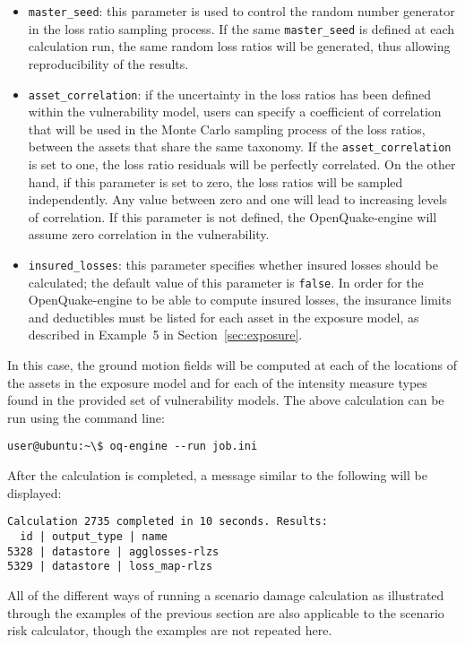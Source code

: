 \begin{itemize}

  \item \Verb+master_seed+: this parameter is used to control the random
    number generator in the loss ratio sampling process. If the same
    \Verb+master_seed+ is defined at each calculation run, the same random loss
    ratios will be generated, thus allowing reproducibility of the results.

  \item \Verb+asset_correlation+: if the uncertainty in the loss ratios
    has been defined within the \gls{vulnerability model}, users can specify
    a coefficient of correlation that will be used in the Monte Carlo sampling
    process of the loss ratios, between the assets that share the same
    \gls{taxonomy}. If the \Verb+asset_correlation+ is set to one,
    the loss ratio residuals will be perfectly correlated. On the other hand,
    if this parameter is set to zero, the loss ratios will be sampled
    independently. Any value between zero and one will lead to increasing
    levels of correlation. If this parameter is not defined, the
    OpenQuake-engine will assume zero correlation in the vulnerability.

  \item \Verb+insured_losses+: this parameter specifies whether insured losses
    should be calculated; the default value of this parameter is \Verb+false+.
    In order for the OpenQuake-engine to be able to compute insured losses, the
    insurance limits and deductibles must be listed for each asset in the 
    exposure model, as described in Example~5 in Section~\ref{sec:exposure}.

\end{itemize}

In this case, the ground motion fields will be computed at each of the
locations of the assets in the exposure model and for each of the intensity
measure types found in the provided set of vulnerability models. The above
calculation can be run using the command line:

\begin{verbatim}
user@ubuntu:~\$ oq-engine --run job.ini
\end{verbatim}

After the calculation is completed, a message similar to the following will be
displayed:

\begin{verbatim}
Calculation 2735 completed in 10 seconds. Results:
  id | output_type | name
5328 | datastore | agglosses-rlzs
5329 | datastore | loss_map-rlzs
\end{verbatim}

All of the different ways of running a scenario damage calculation as
illustrated through the examples of the previous section are also applicable
to the scenario risk calculator, though the examples are not repeated here.
